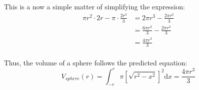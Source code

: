 \documentclass[11pt]{article}
\begin{document}
This is a now a simple matter of simplifying the expression:
\begin{equation*}
\begin{split}
\pi r^{2}\cdot 2r-\pi\cdot \frac{2r^{3}}{3}
&=      2\pi r^{3}    -\frac{2\pi r^{3}}{3}\\
&=\frac{6\pi r^{3}}{3}-\frac{2\pi r^{3}}{3}\\
&=\frac{4\pi r^{3}}{3}\\
\end{split}
\end{equation*}

Thus, the volume of a sphere follows the predicted equation:
\begin{equation*}
V_{sphere}(r)=\int_{-r}^{r}\pi\left [\sqrt{r^{2}-x^{2}}\right ]^{2}\mathrm dx=\frac{4\pi r^{3}}{3}
\end{equation*}
\end{document}
